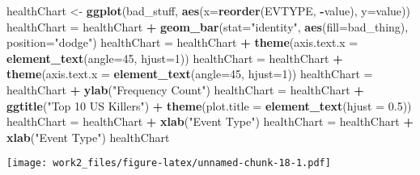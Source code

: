 \documentclass[]{article}
\newenvironment{Shaded}{\begin{snugshade}}{\end{snugshade}}
\newcommand{\DataTypeTok}[1]{\textcolor[rgb]{0.13,0.29,0.53}{#1}}
\newcommand{\DecValTok}[1]{\textcolor[rgb]{0.00,0.00,0.81}{#1}}
\newcommand{\FloatTok}[1]{\textcolor[rgb]{0.00,0.00,0.81}{#1}}
\newcommand{\KeywordTok}[1]{\textcolor[rgb]{0.13,0.29,0.53}{\textbf{#1}}}
\newcommand{\NormalTok}[1]{#1}
\newcommand{\OperatorTok}[1]{\textcolor[rgb]{0.81,0.36,0.00}{\textbf{#1}}}
\newcommand{\StringTok}[1]{\textcolor[rgb]{0.31,0.60,0.02}{#1}}
\begin{document}
\begin{Shaded}
\begin{Highlighting}[]
\NormalTok{healthChart <-}\StringTok{ }\KeywordTok{ggplot}\NormalTok{(bad_stuff, }\KeywordTok{aes}\NormalTok{(}\DataTypeTok{x=}\KeywordTok{reorder}\NormalTok{(EVTYPE, }\OperatorTok{-}\NormalTok{value), }\DataTypeTok{y=}\NormalTok{value))}
\NormalTok{healthChart =}\StringTok{ }\NormalTok{healthChart }\OperatorTok{+}\StringTok{ }\KeywordTok{geom_bar}\NormalTok{(}\DataTypeTok{stat=}\StringTok{"identity"}\NormalTok{, }\KeywordTok{aes}\NormalTok{(}\DataTypeTok{fill=}\NormalTok{bad_thing), }\DataTypeTok{position=}\StringTok{"dodge"}\NormalTok{)}
\NormalTok{healthChart =}\StringTok{ }\NormalTok{healthChart }\OperatorTok{+}\StringTok{ }\KeywordTok{theme}\NormalTok{(}\DataTypeTok{axis.text.x =} \KeywordTok{element_text}\NormalTok{(}\DataTypeTok{angle=}\DecValTok{45}\NormalTok{, }\DataTypeTok{hjust=}\DecValTok{1}\NormalTok{))}
\NormalTok{healthChart =}\StringTok{ }\NormalTok{healthChart }\OperatorTok{+}\StringTok{ }\KeywordTok{theme}\NormalTok{(}\DataTypeTok{axis.text.x =} \KeywordTok{element_text}\NormalTok{(}\DataTypeTok{angle=}\DecValTok{45}\NormalTok{, }\DataTypeTok{hjust=}\DecValTok{1}\NormalTok{))}
\NormalTok{healthChart =}\StringTok{ }\NormalTok{healthChart }\OperatorTok{+}\StringTok{ }\KeywordTok{ylab}\NormalTok{(}\StringTok{"Frequency Count"}\NormalTok{) }
\NormalTok{healthChart =}\StringTok{ }\NormalTok{healthChart }\OperatorTok{+}\StringTok{ }\KeywordTok{ggtitle}\NormalTok{(}\StringTok{"Top 10 US Killers"}\NormalTok{) }\OperatorTok{+}\StringTok{ }\KeywordTok{theme}\NormalTok{(}\DataTypeTok{plot.title =} \KeywordTok{element_text}\NormalTok{(}\DataTypeTok{hjust =} \FloatTok{0.5}\NormalTok{))}
\NormalTok{healthChart =}\StringTok{ }\NormalTok{healthChart }\OperatorTok{+}\StringTok{ }\KeywordTok{xlab}\NormalTok{(}\StringTok{"Event Type"}\NormalTok{) }
\NormalTok{healthChart =}\StringTok{ }\NormalTok{healthChart }\OperatorTok{+}\StringTok{ }\KeywordTok{xlab}\NormalTok{(}\StringTok{"Event Type"}\NormalTok{) }
\NormalTok{healthChart}
\end{Highlighting}
\end{Shaded}

\texttt{[image: work2\_files/figure-latex/unnamed-chunk-18-1.pdf]}
\end{document}
